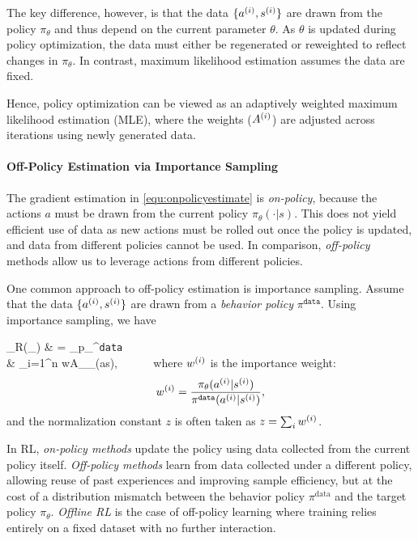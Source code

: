 \documentclass[letterpaper,11pt]{article}
\begin{document}
The key difference, however, is that the data $\{a^{(i)}, s^{(i)}\}$ are drawn from the policy $\pi_\theta$ and thus depend on the current parameter $\theta$. As $\theta$ is updated during policy optimization, the data must either be regenerated or reweighted to reflect changes in $\pi_\theta$. In contrast, maximum likelihood estimation assumes the data are fixed.  

Hence, policy optimization can be viewed as an adaptively weighted maximum likelihood estimation (MLE), where the weights ($A^{(i)}$) are adjusted across iterations using newly generated data.

 

\paragraph{Off-Policy Estimation via Importance Sampling}  
The gradient estimation in \eqref{equ:onpolicyestimate} 
is \emph{on-policy}, 
because the actions $a$ must be drawn from the current policy $\pi_\theta(\cdot | s)$. 
This does not yield efficient use of data
as new actions must be rolled out once the policy is updated, 
and data from different 
policies cannot be used. 
In comparison, \emph{off-policy} methods 
allow us to leverage actions from different policies. 


One common approach to off-policy estimation is importance sampling. 
Assume that the data $\{a^{(i)}, s^{(i)}\}$ are drawn from a \emph{behavior policy} $\pi^{\mathtt{data}}$. 
Using importance sampling, we have 
 
\bb 
\nabla_\theta R(\pi_\theta)  
& = \E_{p_{\pi^{\texttt{data}}}}  \\ 
& \approx {} \sum_{i=1}^n 
w\datai A\datai  \nabla_\theta \log \pi_\theta (a\datai \mid s\datai), ~~~~~ 
\ee 
where $w^{(i)}$ is the importance weight: 
$$
w^{(i)} = \frac{\pi_\theta(a^{(i)}|s^{(i)})}{\pi^{\mathtt{data}}(a^{(i)}|s^{(i)})}, 
$$
and the normalization constant $z$ is often taken as $z = \sum_i w^{(i)}$. 

\begin{cremark}
In RL, \emph{on-policy methods} update the policy using data collected from the current policy itself.  
\emph{Off-policy methods} learn from data collected under a different policy, allowing reuse of past experiences and improving sample efficiency, but at the cost of a distribution mismatch between the behavior policy $\pi^{\text{data}}$ and the target policy $\pi_\theta$.  
\emph{Offline RL} is the case of off-policy learning where training relies entirely on a fixed dataset with no further interaction.  
\end{cremark}
\end{document}
